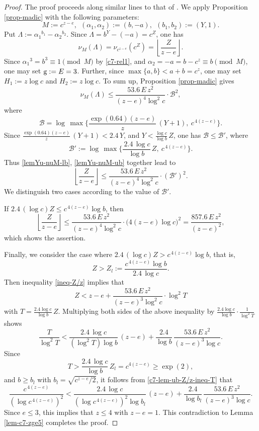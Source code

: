 \documentclass[11pt]{amsart}
\numberwithin{equation}{section}
\begin{document}
\begin{proof}%
The proof proceeds along similar lines to that of \cite[Lemma 4.3]{MP2}.
We apply Proposition \ref{prop-madic} with the following parameters:
\[
M:=c^{z-e}, \ \ (\alpha_1,\alpha_2):=(b,-a), \ \ (b_1,b_2):=(Y,1).
\]
Put $\varLambda:={\alpha_1}^{b_1} - {\alpha_2}^{b_2}$.
Since $\varLambda = b^Y-(-a)= c^Z$, one has
\begin{equation}\label{lemYu-nuM-lb}
\nu_M (\varLambda) = \nu_{c^{z-e}} (c^Z) = \left\lfloor \frac{Z}{z-e} \right\rfloor.
\end{equation}
Since ${\alpha_1}^3=b^3 \equiv 1 \pmod{M}$ by \eqref{c7-rel1}, and $\alpha_2=-a=b-c^z \equiv b \pmod{M}$, one may set ${\rm g}:=E=3$.
Further, since $\max\{a,b\}<a+b=c^z$, one may set $H_1:=z\log c$ and $H_2:=z\log c$.
To sum up, Proposition \ref{prop-madic} gives
\begin{equation}\label{lemYu-nuM-ub}
\nu_M (\varLambda) \le 
\frac{53.6\,E\,z^2}{(z-e)^4 \log^2 c} \cdot \mathcal B^2,
\end{equation}
where
\[
\mathcal B=\log\,\max \biggr\{ \frac{ \exp(0.64)(z-e)}{z}\,(Y+1), \ c^{\,4(z-e)} \biggr\}.
\]
Since $ \frac{ \exp(0.64)(z-e)}{z}\,(Y+1)<2.4\,Y$, and $Y<\frac{\log c}{\log b}\,Z$, one has $\mathcal B \le \mathcal B'$, where
\[
\mathcal B':=\log \,\max \biggr\{ \frac{\,2.4\, \log c}{\log b}\,Z, \ c^{\,4(z-e)} \biggr \}.
\]
Thus \eqref{lemYu-nuM-lb}, \eqref{lemYu-nuM-ub} together lead to
\begin{equation} \label{ineq-Z/z}
\left\lfloor \frac{Z}{z-e} \right\rfloor 
\le 
\frac{53.6\,E\,z^2}{(z-e)^4\log^2 c} \cdot ({\mathcal B'})^2.
\end{equation}
We distinguish two cases according to the value of ${\mathcal B'}$.

If $2.4\,(\log c)Z \le c^{\,4(z-e)}\log b$, then
\[
\left\lfloor \frac{Z}{z-e} \right\rfloor 
\le
\frac{53.6\,E\,z^2}{(z-e)^4 \log^2 c} \cdot \big(4(z-e)\log c\bigr)^2=\frac{857.6\,E\,z^2}{(z-e)^2},
\]
which shows the assertion. 

Finally, we consider the case where $2.4\,(\log c)Z>c^{\,4(z-e)}\log b$, that is, 
\[
Z>Z_l:=\frac{c^{\,4(z-e)} \log b}{2.4\,\log c}.
\]
Then inequality \eqref{ineq-Z/z} implies that
\[
Z < z-e + \frac{53.6\,E\,z^2}{(z-e)^3 \log^2 c} \cdot \log^2 T
\]
with $T=\frac{ 2.4 \log c }{ \log b}\,Z$.
Multiplying both sides of the above inequality by $\frac{ 2.4 \log c }{ \log b}\cdot \frac{1}{\log^2 T}$ shows
\begin{equation} \label{c7-lem-ub-Z/z-ineq-T}
\frac{T}{\log^2 T} 
< 
\frac{2.4\, \log c }{(\log^2 T) \log b}\,(z-e)+ \frac{2.4}{\log b}\,\frac{53.6\,E\,z^2}{(z-e)^3 \log c}.
\end{equation}
Since
\[
T%
> \frac{ 2.4\, \log c }{ \log b}\,Z_l=c^{4(z-e)} \ge \exp(2),
\]
and $b \ge b_l$ with $b_l=\sqrt{c^{z-e}/2}$, it follows from \eqref{c7-lem-ub-Z/z-ineq-T} that 
\[
\frac{c^{\,4(z-e)}}{(\log c^{\,4(z-e)})^2}
<
\frac{ 2.4\, \log c }{ (\log c^{\,4(z-e)})^2\log b_l}\,(z-e)+ \frac{ 2.4 }{ \log b_l}\,\frac{53.6\,E\,z^2}{(z-e)^3 \log c}.
\]
Since $e \le 3$, this implies that $z \le 4$ with $z-e=1$.
This contradiction to Lemma \ref{lem-c7-zge5} completes the proof.
\end{proof}
\end{document}
